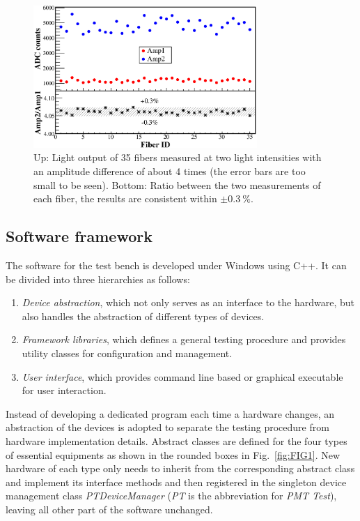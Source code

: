 \documentclass{nst}
\begin{document}
\begin{figure}[!htb]
	\centering
	\includegraphics[width=85mm]{FIG5}
	\caption{Up: Light output of 35 fibers measured at two light intensities with an amplitude difference of about 4 times (the error bars are too small to be seen).
		Bottom: Ratio between the two measurements of each fiber, the results are consistent within $\pm\SI{0.3}{\percent}$.}
	\label{fig:FIG5}
\end{figure} 

\subsection{Software framework}
\label{sec:software}

The software for the test bench is developed under Windows using C++. It can be divided into three hierarchies as follows:
\begin{enumerate}
	\item \textit{Device abstraction}, which not only serves as an interface to the hardware, but also handles the abstraction of different types of devices. 
	\item \textit{Framework libraries}, which defines a general testing procedure and provides utility classes for configuration and management.
	\item \textit{User interface}, which provides command line based or graphical executable for user interaction. 
\end{enumerate}

Instead of developing a dedicated program each time a hardware changes, an abstraction of the devices is adopted to separate the testing procedure from hardware implementation details. 
Abstract classes are defined for the four types of essential equipments as shown in the rounded boxes in Fig.~\ref{fig:FIG1}.
New hardware of each type only needs to inherit from the corresponding abstract class and implement its interface methods and then registered in the singleton device management class \textit{PTDeviceManager} (\textit{PT} is the abbreviation for \textit{PMT Test}), leaving all other part of the software unchanged.
\end{document}
